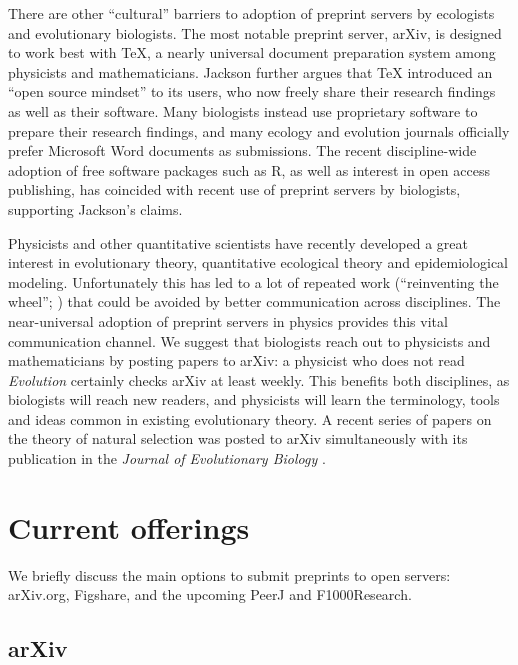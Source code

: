 \documentclass[letterpaper,twocolumn,superscriptaddress,showkeys]{revtex4}
\begin{document}
There are other ``cultural'' barriers to adoption of preprint servers
by ecologists and evolutionary biologists.  The most notable preprint
server, arXiv, is designed to work best with \TeX{}, a nearly
universal document preparation system among physicists and
mathematicians.  Jackson \cite{jackson2002preprints} further argues
that \TeX{} introduced an ``open source mindset'' to its users, who
now freely share their research findings as well as their software.
Many biologists instead use proprietary software to prepare their
research findings, and many ecology and evolution journals officially
prefer Microsoft Word documents as submissions.  The recent
discipline-wide adoption of free software packages such as R, as well
as interest in open access publishing, has coincided with recent use
of preprint servers by biologists, supporting Jackson's claims.

Physicists and other quantitative scientists have recently developed a
great interest in evolutionary theory, quantitative ecological theory
and epidemiological modeling.  Unfortunately this has led to a lot of
repeated work (``reinventing the wheel''; \cite{de2011contribution})
that could be avoided by better communication across disciplines.  The
near-universal adoption of preprint servers in physics provides this
vital communication channel.  We suggest that biologists reach out to
physicists and mathematicians by posting papers to arXiv: a physicist
who does not read \emph{Evolution} certainly checks arXiv at least
weekly.  This benefits both disciplines, as biologists will reach new
readers, and physicists will learn the terminology, tools and ideas
common in existing evolutionary theory.  A recent series of papers on
the theory of natural selection was posted to arXiv simultaneously
with its publication in the \emph{Journal of Evolutionary Biology}
\cite{JEB:JEB2431,JEB:JEB2498,JEB:JEB2378,JEB:JEB2373}.

\section{Current offerings}

We briefly discuss the main options to submit preprints to open servers:
arXiv.org, Figshare, and the upcoming PeerJ and F1000Research.

\subsection{arXiv}

%
\end{document}
